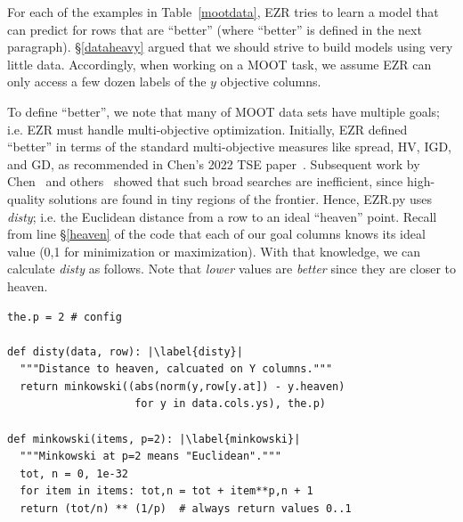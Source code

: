 \documentclass[AMA,STIX2COL]{WileyNJDv5}
\begin{document}
For each of the examples in Table~\ref{mootdata}, EZR tries to learn a model
that can predict for rows that are ``better'' (where ``better'' is defined
in the next paragraph). 
\S\ref{dataheavy} argued that we should strive to build models   using very little data.
Accordingly, when working on a MOOT task, we assume EZR can only
access a few dozen labels of the $y$ objective columns.  
 

To define ``better'', we note that many of   MOOT data sets have multiple goals; i.e. EZR must handle multi-objective optimization.
Initially,  EZR defined ``better'' in terms of the standard
multi-objective measures like  spread, HV, IGD, and GD, as
recommended in Chen's 2022 TSE paper~\cite{Li22}. Subsequent work by
Chen~\cite{chen2026promisetune} and others~\cite{ganguly2025lowgodatalightse}
showed that such broad searches are   inefficient, since high-quality
solutions are   found in  tiny regions of the frontier.
Hence, EZR.py  uses \textsf{\em disty}; i.e.  the Euclidean distance from a row to an   ideal ``heaven'' point.  Recall from line \S\ref{heaven} of the code
that each of our goal columns knows its ideal value (0,1 for minimization or maximization). With that knowledge,    we can calculate \textsf{\em disty} as follows. Note that {\em lower} values are {\em better} since they are closer to heaven.
\begin{verbatim}
the.p = 2 # config

def disty(data, row): |\label{disty}|
  """Distance to heaven, calcuated on Y columns."""
  return minkowski((abs(norm(y,row[y.at]) - y.heaven)
                    for y in data.cols.ys), the.p)

def minkowski(items, p=2): |\label{minkowski}|
  """Minkowski at p=2 means "Euclidean"."""
  tot, n = 0, 1e-32
  for item in items: tot,n = tot + item**p,n + 1
  return (tot/n) ** (1/p)  # always return values 0..1
\end{verbatim}

  
\end{document}
